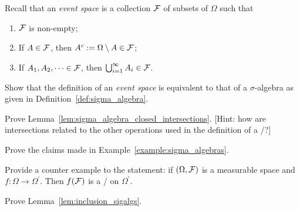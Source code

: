 \begin{problem}\label{prb:event_space_are_sigma_algebras}
Recall that an \emph{event space} is a collection $\mathcal F$ of subsets of $\Omega$ such that
\begin{enumerate}[label=(\alph*)]
\item $\mathcal F$ is non-empty;
\item If $A \in \mathcal F$, then $A^c := \Omega \setminus A \in \mathcal F$;
\item If $A_1, A_2, \dots \in \mathcal F$, then $\bigcup_{i = 1}^\infty A_i \in \mathcal F$.
\end{enumerate}
Show that the definition of an \emph{event space} is equivalent to that of a $\sigma$-algebra as given in Definition~\ref{def:sigma_algebra}.
\end{problem}

\begin{problem}\label{prb:sigma_algebra_closed_intersections}
Prove Lemma~\ref{lem:sigma_algebra_closed_intersections}. [Hint: how are intersections related to the other operations used in the definition of a \sigalg/?]
\end{problem}

\begin{problem}\label{prb:example_sigalgs}
Prove the claims made in Example~\ref{example:sigma_algebras}.
\end{problem}



\begin{problem}\label{prb:converse_preimage_sigma_algebra}
Provide a counter example to the statement: if $(\Omega, \mathcal F)$ is a measurable space and $f : \Omega \to \Omega^\prime$. Then $f(\mathcal F)$ is a \sigalg/ on $\Omega^\prime$.
\end{problem}

\begin{problem}\label{prb:inclusion_sigalgs}
Prove Lemma~\ref{lem:inclusion_sigalgs}.
\end{problem}




